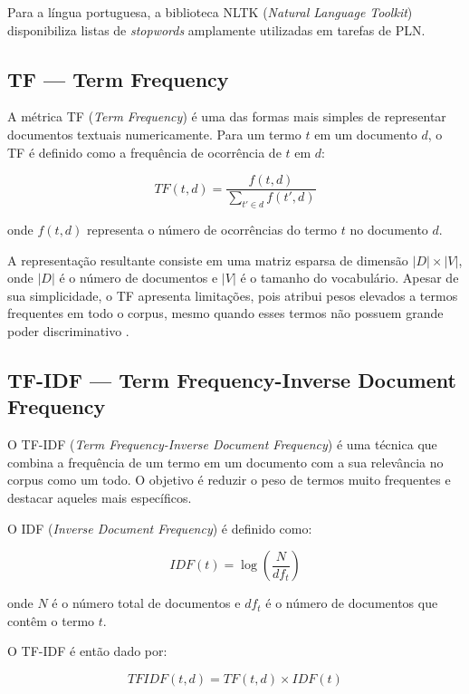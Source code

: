 \documentclass[
	article,
	12pt,
	oneside,
	a4paper,
	english,
	brazil,
	sumario=tradicional
]{abntex2}
\begin{document}
Para a língua portuguesa, a biblioteca NLTK (\textit{Natural Language Toolkit}) disponibiliza listas de \textit{stopwords} amplamente utilizadas em tarefas de PLN.

\subsection{TF — Term Frequency}

A métrica TF (\textit{Term Frequency}) é uma das formas mais simples de representar documentos textuais numericamente. Para um termo $t$ em um documento $d$, o TF é definido como a frequência de ocorrência de $t$ em $d$:

\begin{equation}
TF(t,d) = \frac{f(t,d)}{\sum_{t' \in d} f(t',d)}
\end{equation}

onde $f(t,d)$ representa o número de ocorrências do termo $t$ no documento $d$.

A representação resultante consiste em uma matriz esparsa de dimensão $|D| \times |V|$, onde $|D|$ é o número de documentos e $|V|$ é o tamanho do vocabulário. Apesar de sua simplicidade, o TF apresenta limitações, pois atribui pesos elevados a termos frequentes em todo o corpus, mesmo quando esses termos não possuem grande poder discriminativo \cite{manning2008ir}.

\subsection{TF-IDF — Term Frequency-Inverse Document Frequency}

O TF-IDF (\textit{Term Frequency-Inverse Document Frequency}) é uma técnica que combina a frequência de um termo em um documento com a sua relevância no corpus como um todo. O objetivo é reduzir o peso de termos muito frequentes e destacar aqueles mais específicos.

O IDF (\textit{Inverse Document Frequency}) é definido como:

\begin{equation}
IDF(t) = \log \left( \frac{N}{df_t} \right)
\end{equation}

onde $N$ é o número total de documentos e $df_t$ é o número de documentos que contêm o termo $t$.

O TF-IDF é então dado por:

\begin{equation}
TFIDF(t,d) = TF(t,d) \times IDF(t)
\end{equation}
\end{document}
